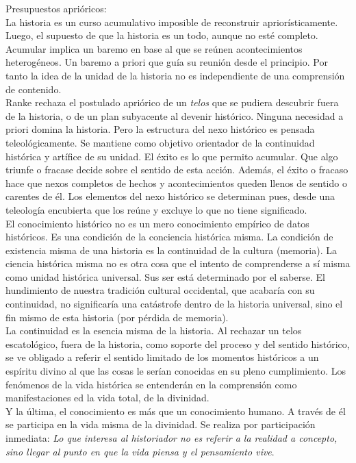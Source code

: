 \documentclass[a4paper, 11pt, twocolumn, spanish]{article}
\begin{document}
Presupuestos aprióricos:\\[0pt]
La historia es un curso acumulativo imposible de reconstruir
apriorísticamente. Luego, el supuesto de que la historia es un todo,
aunque no esté completo. Acumular implica un baremo en base al que se
reúnen acontecimientos heterogéneos. Un baremo a priori que guía su
reunión desde el principio. Por tanto la idea de la unidad de la
historia no es independiente de una comprensión de contenido.\\[0pt]
Ranke rechaza el postulado apriórico de un \emph{telos} que se pudiera
descubrir fuera de la historia, o de un plan subyacente al devenir
histórico. Ninguna necesidad a priori domina la historia. Pero la
estructura del nexo histórico es pensada teleológicamente. Se mantiene
como objetivo orientador de la continuidad histórica y artífice de su
unidad. El éxito es lo que permito acumular. Que algo triunfe o
fracase decide sobre el sentido de esta acción. Además, el éxito o
fracaso hace que nexos completos de hechos y acontecimientos queden
llenos de sentido o carentes de él. Los elementos del nexo histórico
se determinan pues, desde una teleología encubierta que los reúne y
excluye lo que no tiene significado.\\[0pt]
El conocimiento histórico no es un mero conocimiento empírico de datos
históricos. Es una condición de la conciencia histórica misma. La
condición de existencia misma de una historia es la continuidad de la
cultura (memoria). La ciencia histórica misma no es otra cosa que el
intento de comprenderse a sí misma como unidad histórica
universal. Sus ser está determinado por el saberse. El hundimiento de
nuestra tradición cultural occidental, que acabaría con su
continuidad, no significaría una catástrofe dentro de la historia
universal, sino el fin mismo de esta historia (por pérdida de
memoria).\\[0pt]
La continuidad es la esencia misma de la historia. Al rechazar un
telos escatológico, fuera de la historia, como soporte del proceso y
del sentido histórico, se ve obligado a referir el sentido limitado de
los momentos históricos a un espíritu divino al que las cosas le
serían conocidas en su pleno cumplimiento. Los fenómenos de la vida
histórica se entenderán en la comprensión como manifestaciones ed la
vida total, de la divinidad.\\[0pt]
Y la última, el conocimiento es más que un conocimiento humano. A
través de él se participa en la vida misma de la divinidad. Se realiza
por participación inmediata: \emph{Lo que interesa al historiador no es
referir a la realidad a concepto, sino llegar al punto en que la vida
piensa y el pensamiento vive}.
\end{document}
